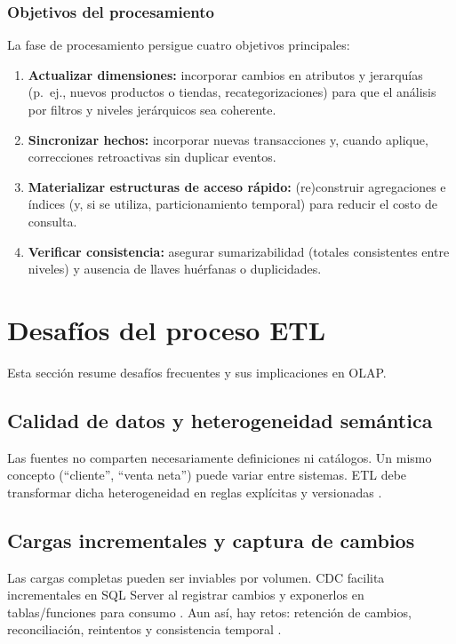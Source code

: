 \documentclass[12pt]{article}
\begin{document}
\subsubsection{Objetivos del procesamiento}
La fase de procesamiento persigue cuatro objetivos principales:
\begin{enumerate}[label=\textbf{P\arabic*.}, leftmargin=*]
\item \textbf{Actualizar dimensiones:} incorporar cambios en atributos y jerarquías (p.\ ej., nuevos productos o tiendas, recategorizaciones) para que el análisis por filtros y niveles jerárquicos sea coherente.
\item \textbf{Sincronizar hechos:} incorporar nuevas transacciones y, cuando aplique, correcciones retroactivas sin duplicar eventos.
\item \textbf{Materializar estructuras de acceso rápido:} (re)construir agregaciones e índices (y, si se utiliza, particionamiento temporal) para reducir el costo de consulta.
\item \textbf{Verificar consistencia:} asegurar sumarizabilidad (totales consistentes entre niveles) y ausencia de llaves huérfanas o duplicidades. \cite{kimball_etl_toolkit,gray_cube}
\end{enumerate}

\section{Desafíos del proceso ETL}
Esta sección resume desafíos frecuentes y sus implicaciones en OLAP.

\subsection{Calidad de datos y heterogeneidad semántica}
Las fuentes no comparten necesariamente definiciones ni catálogos. Un mismo concepto (``cliente'', ``venta neta'') puede variar entre sistemas. ETL debe transformar dicha heterogeneidad en reglas explícitas y versionadas \cite{kimball_etl_toolkit,ibm_etl}.

\subsection{Cargas incrementales y captura de cambios}
Las cargas completas pueden ser inviables por volumen. CDC facilita incrementales en SQL Server al registrar cambios y exponerlos en tablas/funciones para consumo \cite{ms_cdc_overview}. Aun así, hay retos: retención de cambios, reconciliación, reintentos y consistencia temporal \cite{kimball_etl_toolkit}.
\end{document}
